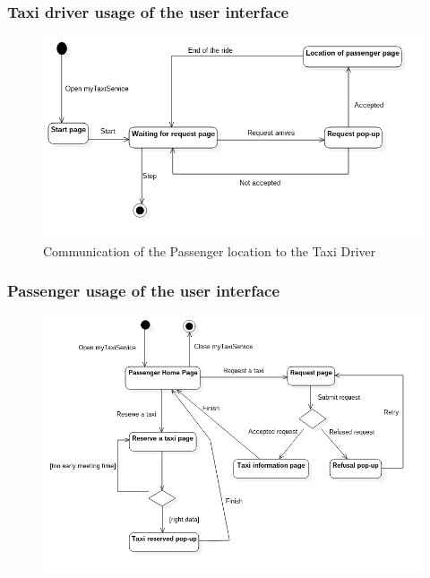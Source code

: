 \subsubsection{Taxi driver usage of the user interface}
\begin{figure}[H]
\centering
\includegraphics[scale=0.5]{Images/statechart_GUI}
\caption{Communication of the Passenger location to the Taxi Driver}
\end{figure}

\subsubsection{Passenger usage of the user interface}
\begin{figure}[H]
\centering
\includegraphics[scale=0.5]{Images/statechart_GUI_Passenger}
\end{figure}
